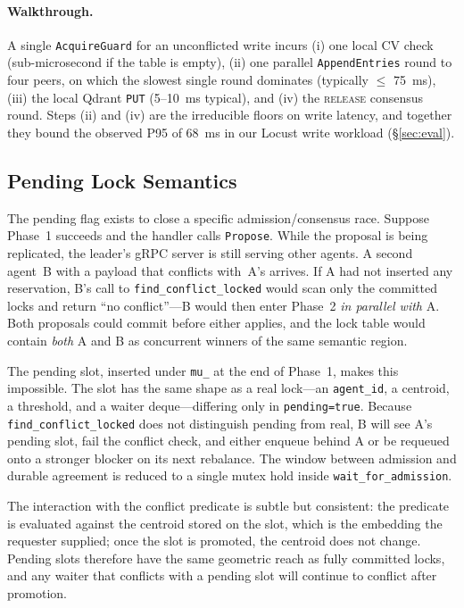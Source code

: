 \documentclass[sigconf]{acmart}
\begin{document}
\paragraph{\textbf{Walkthrough.}} A single \texttt{AcquireGuard} for an
unconflicted write incurs (i) one local CV check (sub-microsecond if the
table is empty), (ii) one parallel \texttt{AppendEntries} round to four
peers, on which the slowest single round dominates (typically $\le$ 75~ms),
(iii) the local Qdrant \texttt{PUT} (5--10~ms typical), and (iv) the
\textsc{release} consensus round. Steps (ii) and (iv) are the irreducible
floors on write latency, and together they bound the observed P95 of 68~ms
in our Locust write workload (\S\ref{sec:eval}).

\subsection{Pending Lock Semantics}
\label{sec:pending}

The pending flag exists to close a specific admission/consensus race.
Suppose Phase~1 succeeds and the handler calls \texttt{Propose}. While the
proposal is being replicated, the leader's gRPC server is still serving
other agents. A second agent~B with a payload that conflicts with~A's
arrives. If A had not inserted any reservation, B's call to
\texttt{find\_conflict\_locked} would scan only the committed locks and
return ``no conflict''---B would then enter Phase~2 \emph{in parallel with}
A. Both proposals could commit before either applies, and the lock table
would contain \emph{both} A and B as concurrent winners of the same
semantic region.

The pending slot, inserted under \texttt{mu\_} at the end of Phase~1, makes
this impossible. The slot has the same shape as a real lock---an
\texttt{agent\_id}, a centroid, a threshold, and a waiter
deque---differing only in \texttt{pending=true}. Because
\texttt{find\_conflict\_locked} does not distinguish pending from real, B
will see A's pending slot, fail the conflict check, and either enqueue
behind A or be requeued onto a stronger blocker on its next rebalance.
The window between admission and durable agreement is reduced to a single
mutex hold inside \texttt{wait\_for\_admission}.

The interaction with the conflict predicate is subtle but consistent: the
predicate is evaluated against the centroid stored on the slot, which is
the embedding the requester supplied; once the slot is promoted, the
centroid does not change. Pending slots therefore have the same
geometric reach as fully committed locks, and any waiter that conflicts
with a pending slot will continue to conflict after promotion.
\end{document}
